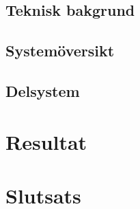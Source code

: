 \documentclass[a4paper]{article}
\begin{document}
\subsection{Teknisk bakgrund}


\subsection{Systemöversikt}


\subsection{Delsystem}




\section{Resultat}




\section{Slutsats}






\end{document}
